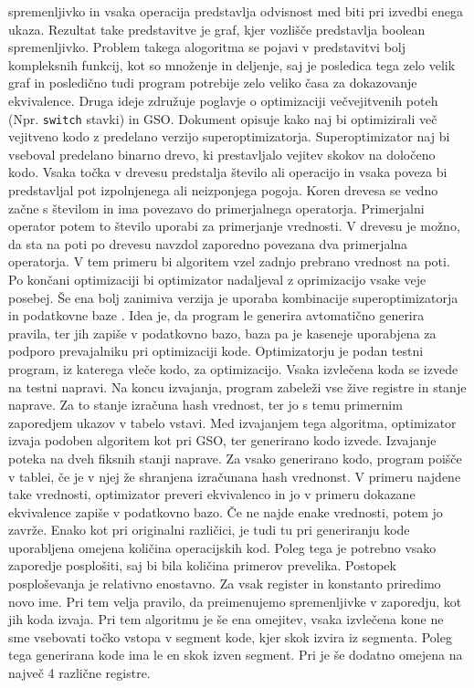 \documentclass[a4paper, 12pt]{book}
\begin{document}
spremenljivko in vsaka operacija predstavlja odvisnost med biti pri izvedbi enega ukaza. Rezultat take predstavitve je graf, kjer vozlišče predstavlja boolean spremenljivko. Problem takega alogoritma se pojavi v predstavitvi bolj kompleksnih funkcij, kot so množenje in deljenje, saj je posledica tega zelo velik graf in posledično tudi program potrebije zelo veliko časa za dokazovanje ekvivalence. Druga ideje združuje poglavje o optimizaciji večvejitvenih poteh (Npr. \texttt{switch} stavki) in GSO. Dokument \cite{branch} opisuje kako naj bi optimizirali več vejitveno kodo z predelano verzijo superoptimizatorja. Superoptimizator naj bi vseboval predelano binarno drevo, ki prestavljalo vejitev skokov na določeno kodo. Vsaka točka v drevesu predstalja število ali operacijo in vsaka poveza bi predstavljal pot izpolnjenega ali neizponjega pogoja. Koren drevesa se vedno začne s številom in ima povezavo do primerjalnega operatorja. Primerjalni operator potem to število uporabi za primerjanje vrednosti. V drevesu je možno, da sta na poti po drevesu navzdol zaporedno povezana dva primerjalna operatorja. V tem primeru bi algoritem vzel zadnjo prebrano vrednost na poti. Po končani optimizaciji bi optimizator nadaljeval z oprimizacijo vsake veje posebej. Še ena bolj zanimiva verzija je uporaba kombinacije superoptimizatorja in podatkovne baze \cite{super}. Idea je, da program le generira avtomatično generira pravila, ter jih zapiše v podatkovno bazo, baza pa je kaseneje uporabjena za podporo prevajalniku pri optimizaciji kode. Optimizatorju je podan testni program, iz katerega vleče kodo, za optimizacijo. Vsaka izvlečena koda se izvede na testni napravi. Na koncu izvajanja, program zabeleži vse žive registre in stanje naprave. Za to stanje izračuna hash vrednost, ter jo s temu primernim zaporedjem ukazov v tabelo vstavi. Med izvajanjem tega algoritma, optimizator izvaja podoben algoritem kot pri GSO, ter generirano kodo izvede. Izvajanje poteka na dveh fiksnih stanji naprave. Za vsako generirano kodo, program poišče v tablei, če je v njej že shranjena izračunana hash vrednonst. V primeru najdene take vrednosti, optimizator preveri ekvivalenco in jo v primeru dokazane ekvivalence zapiše v podatkovno bazo. Če ne najde enake vrednosti, potem jo zavrže. Enako kot pri originalni različici, je tudi tu pri generiranju kode uporabljena omejena količina operacijskih kod. Poleg tega je potrebno vsako zaporedje posplošiti, saj bi bila količina primerov prevelika. Postopek posploševanja je relativno enostavno. Za vsak register in konstanto priredimo novo ime. Pri tem velja pravilo, da preimenujemo spremenljivke v zaporedju, kot jih koda izvaja. Pri tem algoritmu je še ena omejitev, vsaka izvlečena kone ne sme vsebovati točko vstopa v segment kode, kjer skok izvira iz segmenta. Poleg tega generirana kode ima le en skok izven segment. Pri je še dodatno omejena na največ 4 različne registre. 
\end{document}

